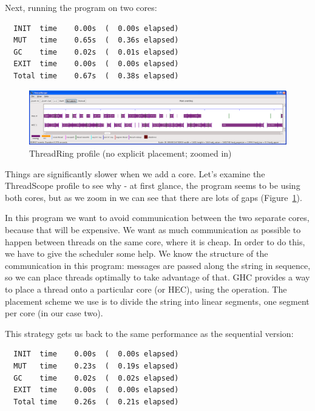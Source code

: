 Next, running the program on two cores:

\begin{verbatim}
  INIT  time    0.00s  (  0.00s elapsed)
  MUT   time    0.65s  (  0.36s elapsed)
  GC    time    0.02s  (  0.01s elapsed)
  EXIT  time    0.00s  (  0.00s elapsed)
  Total time    0.67s  (  0.38s elapsed)
\end{verbatim}

\begin{figure}
\begin{center}
\includegraphics[scale=0.3]{threadring1.png}
\end{center}
\caption{ThreadRing profile (no explicit placement; zoomed in)}
\label{f:threadring1}
\end{figure}

Things are significantly slower when we add a core.  Let's examine the
ThreadScope profile to see why - at first glance, the program seems to
be using both cores, but as we zoom in we can see that there are lots
of gaps (Figure~\ref{f:threadring1}).  

In this program we want to avoid communication between the two
separate cores, because that will be expensive.  We want as much
communication as possible to happen between threads on the same core,
where it is cheap.  In order to do this, we have to give the scheduler
some help.  We know the structure of the communication in this
program: messages are passed along the string in sequence, so we can
place threads optimally to take advantage of that.  GHC provides a way
to place a thread onto a particular core (or HEC), using the
 operation.  The placement scheme we use is to divide
the string into linear segments, one segment per core (in our case
two).

This strategy gets us back to the same performance as the sequential
version:

\begin{verbatim}
  INIT  time    0.00s  (  0.00s elapsed)
  MUT   time    0.23s  (  0.19s elapsed)
  GC    time    0.02s  (  0.02s elapsed)
  EXIT  time    0.00s  (  0.00s elapsed)
  Total time    0.26s  (  0.21s elapsed)
\end{verbatim}

